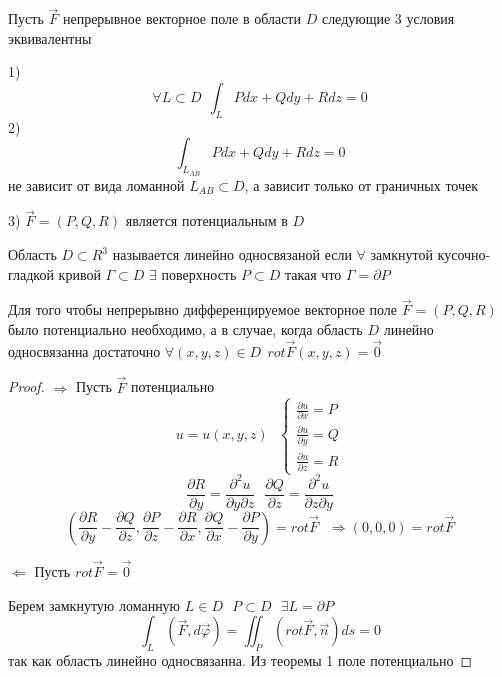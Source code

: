 \begin{theorem}
  Пусть $\vec F$ непрерывное векторное поле в области $D$ следующие 3 условия
  эквивалентны

  1)
  $$
  \forall L \subset D ~~ \int_L Pdx + Qdy + Rdz = 0
  $$
  2)
  $$
  \int_{L_{AB}} Pdx + Qdy + Rdz = 0
  $$
  не зависит от вида ломанной $L_{AB} \subset D$, а зависит только от граничных
  точек

  3)
  $\vec F = (P, Q, R)$ является потенциальным в $D$
\end{theorem}

\begin{define}
  Область $D \subset R^3$ называется линейно односвязаной если $\forall$
  замкнутой кусочно-гладкой кривой $\Gamma \subset D$ $\exists$ поверхность
  $P \subset D$ такая что $\Gamma = \partial P$
\end{define}

\begin{block}
  Для того чтобы непрерывно дифференцируемое векторное поле $\vec F = (P, Q, R)$
  было потенциально необходимо, а в случае, когда область $D$ линейно
  односвязанна достаточно $\forall (x,y,z) \in D ~~ rot \vec F(x,y,z) = \vec 0$
\end{block}

\begin{proof}
  $\Rightarrow$ Пусть $\vec F$ потенциально
  $$
  u = u(x,y,z) ~~~
  \left\{
  \begin{array}{l}
    \frac{\partial u}{\partial x} = P \\
    \frac{\partial u}{\partial y} = Q \\
    \frac{\partial u}{\partial z} = R
  \end{array}
  \right.
  $$
  $$
  \frac{\partial R}{\partial y}
  =
  \frac{\partial^2 u}{\partial y \partial z}
  ~~~
  \frac{\partial Q}{\partial z}
  =
  \frac{\partial^2 u}{\partial z \partial y}
  $$
  $$
  \left(
    \frac{\partial R}{\partial y}
    -
    \frac{\partial Q}{\partial z}
    ,
    \frac{\partial P}{\partial z}
    -
    \frac{\partial R}{\partial x}
    ,
    \frac{\partial Q}{\partial x}
    -
    \frac{\partial P}{\partial y}
  \right)
  = rot \vec F
  ~~~
  \Rightarrow (0, 0, 0) = rot \vec F
  $$

  $\Leftarrow$ Пусть $rot \vec F = \vec 0$

  Берем замкнутую ломанную $L \in D ~~~ P \subset D ~~~ \exists L = \partial P$
  $$
  \int_L (\vec F, d \vec \varphi) = \iint_P (rot \vec F, \vec n) ds = 0
  $$
  так как область линейно односвязанна. Из теоремы 1 поле потенциально
\end{proof}

